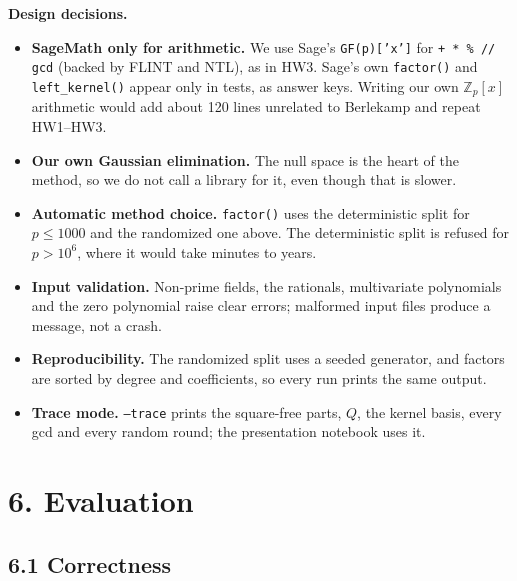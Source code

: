 \documentclass[11pt,a4paper]{article}
\newcommand{\Zpx}{\mathbb{Z}_p[x]}
\begin{document}
\textbf{Design decisions.}
\begin{itemize}
    \item \textbf{SageMath only for arithmetic.} We use Sage's \texttt{GF(p)['x']} for \texttt{+ * \% // gcd} (backed by FLINT and NTL), as in HW3. Sage's own \texttt{factor()} and \texttt{left\_kernel()} appear only in tests, as answer keys. Writing our own $\Zpx$ arithmetic would add about 120 lines unrelated to Berlekamp and repeat HW1--HW3.
    \item \textbf{Our own Gaussian elimination.} The null space is the heart of the method, so we do not call a library for it, even though that is slower.
    \item \textbf{Automatic method choice.} \texttt{factor()} uses the deterministic split for $p \le 1000$ and the randomized one above. The deterministic split is refused for $p > 10^6$, where it would take minutes to years.
    \item \textbf{Input validation.} Non-prime fields, the rationals, multivariate polynomials and the zero polynomial raise clear errors; malformed input files produce a message, not a crash.
    \item \textbf{Reproducibility.} The randomized split uses a seeded generator, and factors are sorted by degree and coefficients, so every run prints the same output.
    \item \textbf{Trace mode.} \texttt{--trace} prints the square-free parts, $Q$, the kernel basis, every gcd and every random round; the presentation notebook uses it.
\end{itemize}

\clearpage
\section*{6. Evaluation}

\subsection*{6.1 Correctness}
\end{document}
